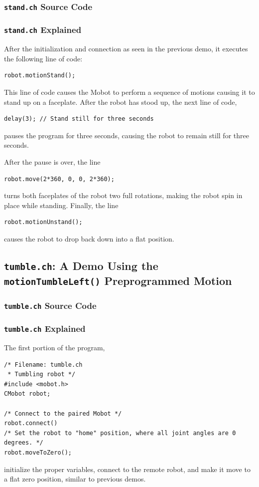 \documentclass{article}
\begin{document}
\subsubsection{\texttt{stand.ch} Source Code}

\subsubsection{\texttt{stand.ch} Explained}
After the initialization and 
connection as seen in the previous demo, it executes the following line of
code:
\begin{verbatim}
robot.motionStand();
\end{verbatim}
This line of code causes the Mobot to perform a sequence of motions causing it to
stand up on a faceplate. After the robot has stood up, the next line of code,
\begin{verbatim}
delay(3); // Stand still for three seconds
\end{verbatim}
pauses the program for three seconds, causing the robot to remain still for three
seconds. 

After the pause is over, the line
\begin{verbatim}
robot.move(2*360, 0, 0, 2*360);
\end{verbatim}
turns both faceplates of the robot two full rotations, making the robot spin in place
while standing. Finally, the line
\begin{verbatim}
robot.motionUnstand();
\end{verbatim}
causes the robot to drop back down into a flat position.

\subsection{\texttt{tumble.ch}: A Demo Using the \texttt{motionTumbleLeft()} Preprogrammed
Motion}
\subsubsection{\texttt{tumble.ch} Source Code}

\subsubsection{\texttt{tumble.ch} Explained}
The first portion of the program,
\begin{verbatim}
/* Filename: tumble.ch 
 * Tumbling robot */
#include <mobot.h>
CMobot robot;

/* Connect to the paired Mobot */
robot.connect()
/* Set the robot to "home" position, where all joint angles are 0 degrees. */
robot.moveToZero();
\end{verbatim}
initialize the proper variables, connect to the remote robot, and make it move
to a flat zero position, similar to previous demos.
\end{document}

